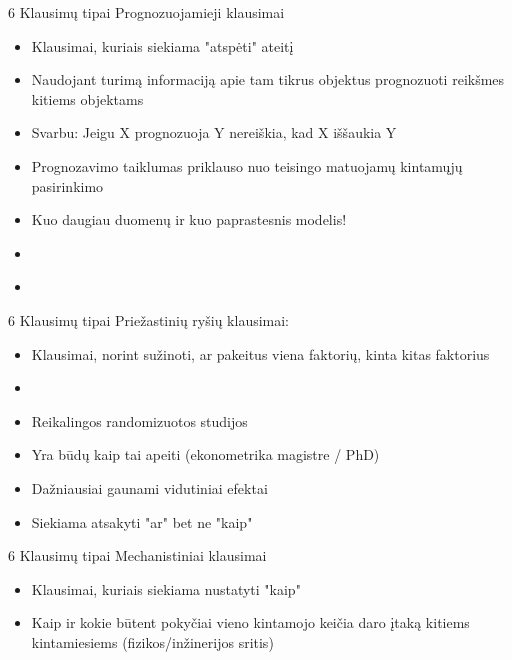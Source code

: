 \documentclass[11pt,xcolor=table]{beamer}
\begin{document}
\begin{frame}{6 Klausimų tipai}
Prognozuojamieji klausimai
\begin{itemize}
\item Klausimai, kuriais siekiama "atspėti" ateitį 
\item Naudojant turimą informaciją apie tam tikrus objektus prognozuoti reikšmes kitiems objektams
\item Svarbu: Jeigu X prognozuoja Y nereiškia, kad X iššaukia Y
\item Prognozavimo taiklumas priklauso nuo teisingo matuojamų kintamųjų pasirinkimo
\item Kuo daugiau duomenų ir kuo paprastesnis modelis!
\item \href{https://fivethirtyeight.com/}{\color{blue}{https://fivethirtyeight.com/}}
\item \href{https://www.amazon.com/Lenovo-ThinkPad-Performance-Business-fingerprint/dp/B077GP6G9M/ref=sr_1_fkmr1_1?keywords=ibm+thinkpad+t460&qid=1549818100&s=gateway&sr=8-1-fkmr1}{\color{blue}{AMAZON IBM E570}}
\end{itemize}
\end{frame}
\begin{frame}{6 Klausimų tipai}
Priežastinių ryšių klausimai:

\begin{itemize}
\item Klausimai, norint sužinoti, ar pakeitus viena faktorių, kinta kitas faktorius
\item \href{http://psyking.net/HTMLobj-4363/Effects_of_Sleep_Deprivation-Schumacher_and_Sipes-Final.pdf}{\color{blue}{How  does  a  lack  of  sleep  impact  memory,  problem  solvingand  critical  thinking  skills  amongstcollege students?}}
\item Reikalingos randomizuotos studijos
\item Yra būdų kaip tai apeiti (ekonometrika magistre / PhD)
\item Dažniausiai gaunami vidutiniai efektai
\item Siekiama atsakyti "ar" bet ne "kaip"
\end{itemize}
\end{frame}
\begin{frame}{6 Klausimų tipai}
Mechanistiniai klausimai
\begin{itemize}
\item Klausimai, kuriais siekiama nustatyti "kaip"
\item Kaip ir kokie būtent pokyčiai vieno kintamojo keičia daro įtaką kitiems kintamiesiems (fizikos/inžinerijos sritis)
\end{itemize}
\end{frame}
\end{document}

